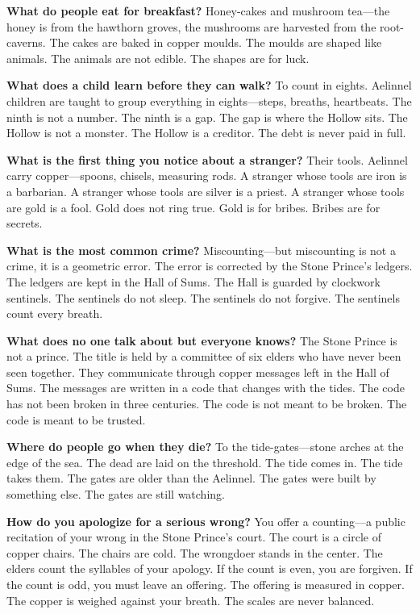 \vspace{1em}

\begin{almanac}
\textbf{What do people eat for breakfast?} Honey-cakes and mushroom tea---the honey is from the hawthorn groves, the mushrooms are harvested from the root-caverns. The cakes are baked in copper moulds. The moulds are shaped like animals. The animals are not edible. The shapes are for luck.

\textbf{What does a child learn before they can walk?} To count in eights. Aelinnel children are taught to group everything in eights---steps, breaths, heartbeats. The ninth is not a number. The ninth is a gap. The gap is where the Hollow sits. The Hollow is not a monster. The Hollow is a creditor. The debt is never paid in full.

\textbf{What is the first thing you notice about a stranger?} Their tools. Aelinnel carry copper---spoons, chisels, measuring rods. A stranger whose tools are iron is a barbarian. A stranger whose tools are silver is a priest. A stranger whose tools are gold is a fool. Gold does not ring true. Gold is for bribes. Bribes are for secrets.

\textbf{What is the most common crime?} Miscounting---but miscounting is not a crime, it is a geometric error. The error is corrected by the Stone Prince's ledgers. The ledgers are kept in the Hall of Sums. The Hall is guarded by clockwork sentinels. The sentinels do not sleep. The sentinels do not forgive. The sentinels count every breath.

\textbf{What does no one talk about but everyone knows?} The Stone Prince is not a prince. The title is held by a committee of six elders who have never been seen together. They communicate through copper messages left in the Hall of Sums. The messages are written in a code that changes with the tides. The code has not been broken in three centuries. The code is not meant to be broken. The code is meant to be trusted.

\textbf{Where do people go when they die?} To the tide-gates---stone arches at the edge of the sea. The dead are laid on the threshold. The tide comes in. The tide takes them. The gates are older than the Aelinnel. The gates were built by something else. The gates are still watching.

\textbf{How do you apologize for a serious wrong?} You offer a counting---a public recitation of your wrong in the Stone Prince's court. The court is a circle of copper chairs. The chairs are cold. The wrongdoer stands in the center. The elders count the syllables of your apology. If the count is even, you are forgiven. If the count is odd, you must leave an offering. The offering is measured in copper. The copper is weighed against your breath. The scales are never balanced.


\end{almanac}
